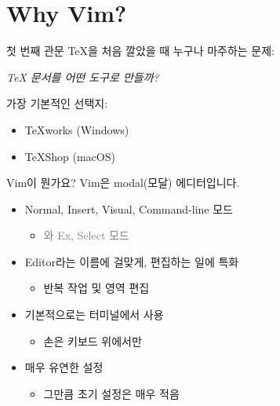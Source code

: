 \documentclass{beamer}
\begin{document}
\frame[plain]{\tableofcontents}

\section{Why Vim?}

\begin{frame}{첫 번째 관문}
  \TeX{}을 처음 깔았을 때 누구나 마주하는 문제:\\\pause\vpad
  \begin{center}\emph{\TeX{} 문서를 어떤 도구로 만들까?}\end{center}
  \pause\vpad

  가장 기본적인 선택지:
  \begin{itemize}
    \item \TeX{}works (Windows)
    \item \TeX{}Shop (macOS)
  \end{itemize}
\end{frame}

\begin{frame}{Vim이 뭔가요?}
  \pause\centering\alert{\Large Vim은 modal(모달) 에디터입니다.}\pause\vpad
  \begin{itemize}
    \item Normal, Insert, Visual, Command-line 모드
      \begin{itemize}
        \item \textcolor{gray}{와 Ex, Select 모드}
      \end{itemize}
    \pause
    \item \alert{Edit}or라는 이름에 걸맞게, 편집하는 일에 특화
      \begin{itemize}
        \item 반복 작업 및 영역 편집
      \end{itemize}
    \pause
    \item 기본적으로는 터미널에서 사용
      \begin{itemize}
        \item 손은 키보드 위에서만
      \end{itemize}
    \pause
    \item \alert{매우 유연한 설정}
      \begin{itemize}
        \item 그만큼 초기 설정은 매우 적음
      \end{itemize}
  \end{itemize}
\end{frame}
\end{document}
